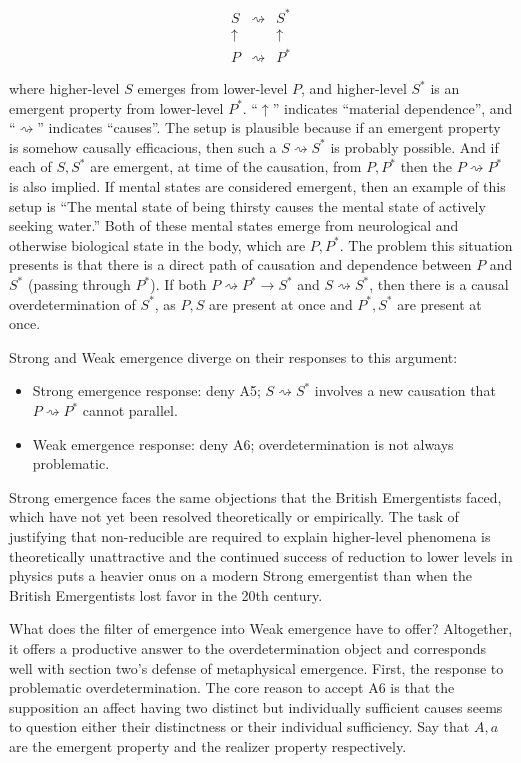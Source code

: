 \documentclass{article}
\begin{document}
\[\begin{array}{ccc}
    S & \rightsquigarrow & S^* \\
    \uparrow & & \uparrow \\
    P & \rightsquigarrow & P^*
\end{array}\]

where higher-level $S$ emerges from lower-level $P$, and higher-level $S^*$ is an emergent property from lower-level $P^*$. ``$\uparrow$'' indicates ``material dependence'', and ``$\rightsquigarrow$'' indicates ``causes''. The setup is plausible because if an emergent property is somehow causally efficacious, then such a $S \rightsquigarrow S^*$ is probably possible. And if each of $S, S^*$ are emergent, at time of the causation, from $P, P^*$ then the $P \rightsquigarrow P^*$ is also implied. If mental states are considered emergent, then an example of this setup is ``The mental state of being thirsty causes the mental state of actively seeking water.'' Both of these mental states emerge from neurological and otherwise biological state in the body, which are $P, P^*$. The problem this situation presents is that there is a direct path of causation and dependence between $P$ and $S^*$ (passing through $P^*$). If both $P \rightsquigarrow P^* \rightarrow S^*$ and $S \rightsquigarrow S^*$, then there is a causal overdetermination of $S^*$, as $P, S$ are present at once and $P^*, S^*$ are present at once.

Strong and Weak emergence diverge on their responses to this argument:

\begin{itemize}
    \item Strong emergence response: deny A5; $S \rightsquigarrow S^*$ involves a new causation that $P \rightsquigarrow P^*$ cannot parallel.
    \item Weak emergence response: deny A6; overdetermination is not always problematic.
\end{itemize}

Strong emergence faces the same objections that the British Emergentists faced, which have not yet been resolved theoretically or empirically. The task of justifying that non-reducible are required to explain higher-level phenomena is theoretically unattractive and the continued success of reduction to lower levels in physics puts a heavier onus on a modern Strong emergentist than when the British Emergentists lost favor in the 20th century.

What does the filter of emergence into Weak emergence have to offer? Altogether, it offers a productive answer to the overdetermination object and corresponds well with section two's defense of metaphysical emergence. First, the response to problematic overdetermination. The core reason to accept A6 is that the supposition an affect having two distinct but individually sufficient causes seems to question either their distinctness or their individual sufficiency. Say that $A, a$ are the emergent property and the realizer property respectively.
\end{document}
